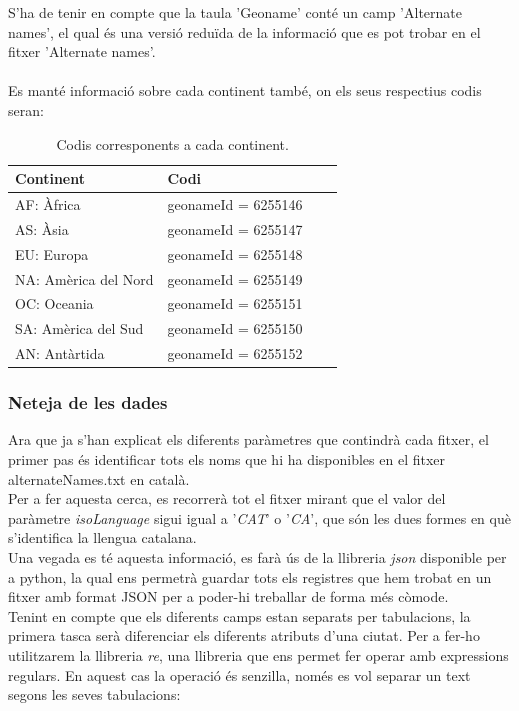 \documentclass[12pt,a4paper,openright,oneside]{article}
\numberwithin{equation}{section}
\theoremstyle{definition}
\begin{document}
S'ha de tenir en compte que la taula 'Geoname' conté un camp 'Alternate names', el qual és una versió reduïda de la informació que es pot trobar en el fitxer 'Alternate names'.
\\\\
Es manté informació sobre cada continent també, on els seus respectius codis seran:
\begin{table}[htbp]
\begin{center}
	\centering
    \begin{tabular}{| l | l | l | l |}
    \hline
    \textbf{Continent} & \textbf{Codi} \\ \hline
    AF: Àfrica &  geonameId = 6255146\\ \hline
	AS: Àsia & geonameId = 6255147\\ \hline
	EU: Europa & geonameId = 6255148\\ \hline
	NA: Amèrica del Nord & geonameId = 6255149\\ \hline
	OC: Oceania & geonameId = 6255151\\ \hline
	SA: Amèrica del Sud & geonameId = 6255150\\ \hline
	AN: Antàrtida & geonameId = 6255152\\ \hline
    \end{tabular}
\end{center}
\caption{Codis corresponents a cada continent.}
\end{table}
\newpage
\subsubsection*{Neteja de les dades}
Ara que ja s'han explicat els diferents paràmetres que contindrà cada fitxer, el primer pas és identificar tots els noms que hi ha disponibles en el fitxer alternateNames.txt en català.\\
Per a fer aquesta cerca, es recorrerà tot el fitxer mirant que el valor del paràmetre \emph{isoLanguage} sigui igual a '\emph{CAT}' o '\emph{CA}', que són les dues formes en què s'identifica la llengua catalana.\\
Una vegada es té aquesta informació, es farà ús de la llibreria \emph{json} disponible per a python, la qual ens permetrà guardar tots els registres que hem trobat en un fitxer amb format JSON per a poder-hi treballar de forma més còmode.\\
Tenint en compte que els diferents camps estan separats per tabulacions, la primera tasca serà diferenciar els diferents atributs d'una ciutat. Per a fer-ho utilitzarem la llibreria \emph{re}, una llibreria que ens permet fer operar amb expressions regulars. En aquest cas la operació és senzilla, només es vol separar un text segons les seves tabulacions:
\end{document}
